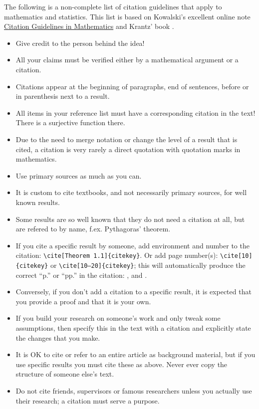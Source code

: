 The following is a non-complete list of citation guidelines that apply to mathematics and statistics. This list is based on Kowalski's excellent online note \hyperlink{https://web.williams.edu/Mathematics/sjmiller/public_html/mathematical_citation_guidelines.pdf}{Citation Guidelines in Mathematics} and Krantz' book \parencite{Kra17}.
\begin{itemize}
    \item Give credit to the person behind the idea!
    \item All your claims must be verified either by a mathematical argument or a citation. 
    \item Citations appear at the beginning of paragraphs, end of sentences, before or in parenthesis next to a result.
       \item All items in your reference list must have a corresponding citation in the text! There is a surjective function there.
    \item Due to the need to merge notation or change the level of a result that is cited, a citation is very rarely a direct quotation with quotation marks in mathematics.
    \item Use primary sources as much as you can.
    \item It is custom to cite textbooks, and not necessarily primary sources, for well known results.
    \item Some results are so well known that they do not need a citation at all, but are refered to by name, f.ex. Pythagoras' theorem. 
    \item If you cite a specific result by someone, add environment and number to the citation: \texttt{\textbackslash cite[Theorem 1.1]\{citekey\}}. Or add page number(s): \texttt{\textbackslash cite[10]\{citekey\}} or \texttt{\textbackslash cite[10--20]\{citekey\}}; this will automatically produce the correct \enquote{p.} or \enquote{pp.} in the citation: \cite[Theorem~1.1]{Kra17}, \cite[10]{Kra17} and \cite[10--20]{Kra17}.
    \item Conversely, if you don't add a citation to a specific result, it is expected that you provide a proof and that it is your own.
    \item If you build your research on someone's work and only tweak some assumptions, then specify this in the text with a citation and explicitly state the changes that you make. 
     \item It is OK to cite or refer to an entire article as background material, but if you use specific results you must cite these as above. Never ever copy the structure of someone else's text.
    \item Do not cite friends, supervisors or famous researchers unless you actually use their research; a citation must serve a purpose.
\end{itemize}





